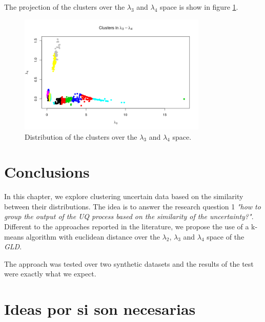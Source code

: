 The projection of the clusters over the $\lambda_{3}$ and $\lambda_{4}$ space is show in figure \ref{fig:dataset2_l3l4_l3_l4}.

\begin{figure}[H]
    \centering
    \includegraphics[width=0.8\textwidth]{img/gld_clustering/Dataset2/nuevo/l3_l4/l3_l4.png}
    \caption{Distribution of the clusters over the $\lambda_{3}$ and $\lambda_{4}$ space.}
    \label{fig:dataset2_l3l4_l3_l4}
\end{figure}


\section{Conclusions}\label{sec:conclusions}

In this chapter, we explore clustering uncertain data based on the similarity between their distributions. The idea is to answer the research question 1 \textit{"how to group the output of the UQ process based on the similarity of the uncertainty?"}. Different to the approaches reported in the literature, we propose the use of a k-means algorithm with euclidean distance over the $\lambda_{2}$, $\lambda_{3}$ and $\lambda_{4}$ space of the \textit{GLD}. 

The approach was tested over two synthetic datasets and the results of the  test were exactly what we expect.


\section{Ideas por si son necesarias}

